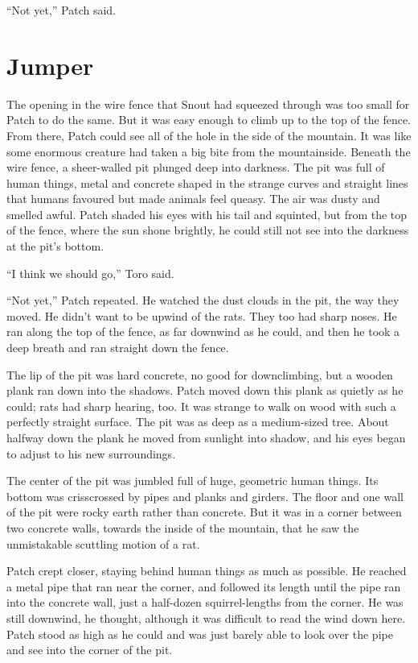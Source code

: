 \documentclass[12pt]{memoir}
\begin{document}
“Not yet,” Patch said.


\section{Jumper}

The opening in the wire fence that Snout had squeezed through was too
small for Patch to do the same. But it was easy enough to climb up to
the top of the fence. From there, Patch could see all of the hole in
the side of the mountain. It was like some enormous creature had taken
a big bite from the mountainside. Beneath the wire fence, a
sheer-walled pit plunged deep into darkness. The pit was full of human
things, metal and concrete shaped in the strange curves and straight
lines that humans favoured but made animals feel queasy. The air was
dusty and smelled awful. Patch shaded his eyes with his tail and
squinted, but from the top of the fence, where the sun shone brightly,
he could still not see into the darkness at the pit’s bottom.

“I think we should go,” Toro said.

“Not yet,” Patch repeated. He watched the dust clouds in the pit, the
way they moved. He didn’t want to be upwind of the rats. They too had
sharp noses. He ran along the top of the fence, as far downwind as he
could, and then he took a deep breath and ran straight down the fence.

The lip of the pit was hard concrete, no good for downclimbing, but a
wooden plank ran down into the shadows. Patch moved down this plank as
quietly as he could; rats had sharp hearing, too. It was strange to
walk on wood with such a perfectly straight surface. The pit was as
deep as a medium-sized tree. About halfway down the plank he moved
from sunlight into shadow, and his eyes began to adjust to his new
surroundings.

The center of the pit was jumbled full of huge, geometric human
things. Its bottom was crisscrossed by pipes and planks and
girders. The floor and one wall of the pit were rocky earth rather
than concrete. But it was in a corner between two concrete walls,
towards the inside of the mountain, that he saw the unmistakable
scuttling motion of a rat.

Patch crept closer, staying behind human things as much as
possible. He reached a metal pipe that ran near the corner, and
followed its length until the pipe ran into the concrete wall, just a
half-dozen squirrel-lengths from the corner. He was still downwind, he
thought, although it was difficult to read the wind down here. Patch
stood as high as he could and was just barely able to look over the
pipe and see into the corner of the pit.
\end{document}
